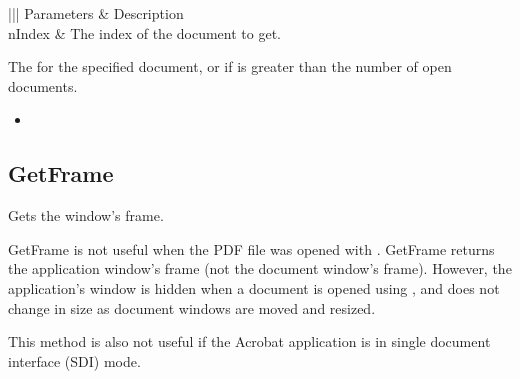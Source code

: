 \documentclass[letterpaper,12pt,english,openany,oneside]{sphinxmanual}
\begin{document}
\begin{savenotes}\sphinxattablestart
\centering
{}\label{\detokenize{IAC_API_OLE_Objects:section-2}}\nobreak
\begin{tabular}[t]{|||}
\hline
\sphinxstyletheadfamily 
Parameters
&\sphinxstyletheadfamily 
Description
\\
\hline
nIndex
&
The index of the document to get.
\\
\hline
\end{tabular}
\par
\sphinxattableend\end{savenotes}


The  for the specified  document, or  if  is greater than the number of open documents.

\label{\detokenize{IAC_API_OLE_Objects:related-methods-4}}
\begin{itemize}
\item {} 
 

\end{itemize}




\subsection{GetFrame}
\label{\detokenize{IAC_API_OLE_Objects:getframe}}
Gets the window’s frame.

GetFrame is not useful when the PDF file was opened with   . GetFrame returns the application window’s frame (not the document window’s frame). However, the application’s window is hidden when a document is opened using  , and does not change in size as document windows are moved and resized.

This method is also not useful if the Acrobat application is in single document interface (SDI) mode.


\begin{sphinxVerbatim}[commandchars=\\\{\}]
 
\end{sphinxVerbatim}
\end{document}

